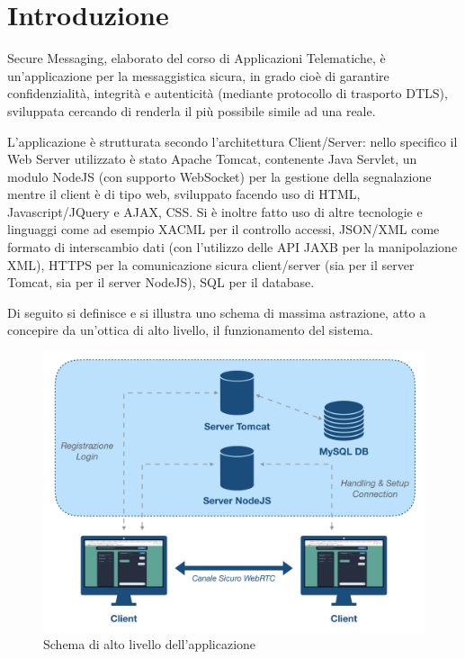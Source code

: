 \textual 

\chapter{Introduzione}


Secure Messaging, elaborato del corso di Applicazioni Telematiche, è un'applicazione per la messaggistica sicura, in grado cioè di garantire confidenzialità, integrità e autenticità (mediante protocollo di trasporto DTLS), sviluppata cercando di renderla il più possibile simile ad una reale.
 
L'applicazione è strutturata secondo l'architettura Client/Server: nello specifico il Web Server utilizzato è stato Apache Tomcat, contenente Java Servlet, un modulo NodeJS (con supporto WebSocket) per la gestione della segnalazione  mentre il client è di tipo web, sviluppato facendo uso di HTML, Javascript/JQuery e AJAX, CSS.
Si è inoltre fatto uso di altre tecnologie e linguaggi come ad esempio XACML per il controllo accessi, JSON/XML come formato di interscambio dati (con l'utilizzo delle API JAXB per la manipolazione XML), HTTPS per la comunicazione sicura client/server (sia per il server Tomcat, sia per il server NodeJS), SQL per il database.

Di seguito si definisce e si illustra uno schema di massima astrazione, atto a concepire da un'ottica di alto livello, il funzionamento del sistema.

\begin{figure}[!htbp]
	\centering
	\includegraphics[scale = .6]{img/schemaGenerale}
	\caption{Schema di alto livello dell'applicazione}
	\label{gfx:schemaGenerale}
\end{figure}


